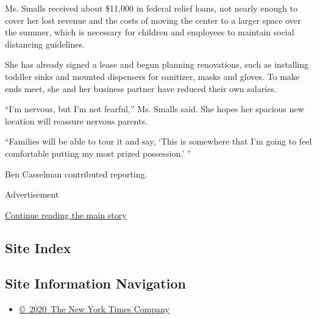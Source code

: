Ms. Smalls received about \$11,000 in federal relief loans, not nearly
enough to cover her lost revenue and the costs of moving the center to a
larger space over the summer, which is necessary for children and
employees to maintain social distancing guidelines.

She has already signed a lease and begun planning renovations, such as
installing toddler sinks and mounted dispensers for sanitizer, masks and
gloves. To make ends meet, she and her business partner have reduced
their own salaries.

``I'm nervous, but I'm not fearful,'' Ms. Smalls said. She hopes her
spacious new location will reassure nervous parents.

``Families will be able to tour it and say, `This is somewhere that I'm
going to feel comfortable putting my most prized possession.' ''

Ben Casselman contributed reporting.

Advertisement

\protect\hyperlink{after-bottom}{Continue reading the main story}

\hypertarget{site-index}{%
\subsection{Site Index}\label{site-index}}

\hypertarget{site-information-navigation}{%
\subsection{Site Information
Navigation}\label{site-information-navigation}}

\begin{itemize}
\tightlist
\item
  \href{https://help.nytimes.com/hc/en-us/articles/115014792127-Copyright-notice}{©~2020~The
  New York Times Company}
\end{itemize}

